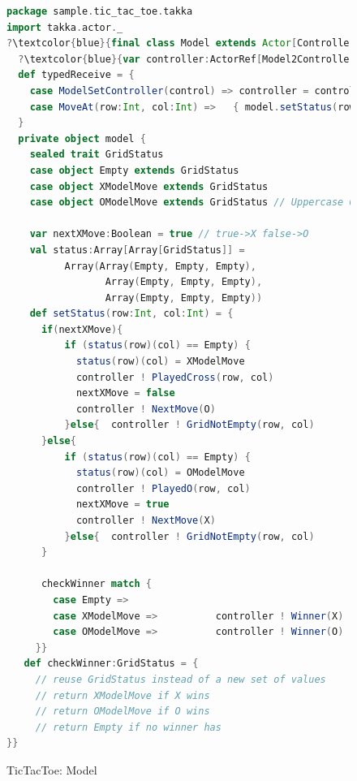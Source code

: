 \begin{figure}[p]

\begin{lstlisting}[language=scala, escapechar=?]
package sample.tic_tac_toe.takka
import takka.actor._
?\textcolor{blue}{final class Model extends Actor[Controller2ModelMessage]}? {
  ?\textcolor{blue}{var controller:ActorRef[Model2ControllerMessage]}? = _  
  def typedReceive = {
    case ModelSetController(control) => controller = control
    case MoveAt(row:Int, col:Int) =>   { model.setStatus(row, col)  }
  }  
  private object model {
    sealed trait GridStatus
    case object Empty extends GridStatus
    case object XModelMove extends GridStatus
    case object OModelMove extends GridStatus // Uppercase O
    
    var nextXMove:Boolean = true // true->X false->O    
    val status:Array[Array[GridStatus]] = 
          Array(Array(Empty, Empty, Empty),
                 Array(Empty, Empty, Empty),
                 Array(Empty, Empty, Empty))
    def setStatus(row:Int, col:Int) = {   
      if(nextXMove){
          if (status(row)(col) == Empty) {
            status(row)(col) = XModelMove
            controller ! PlayedCross(row, col)
            nextXMove = false
            controller ! NextMove(O)
          }else{  controller ! GridNotEmpty(row, col)          }
      }else{
          if (status(row)(col) == Empty) {
            status(row)(col) = OModelMove
            controller ! PlayedO(row, col)
            nextXMove = true
            controller ! NextMove(X)
          }else{  controller ! GridNotEmpty(row, col)          }     
      }

      checkWinner match {
        case Empty =>
        case XModelMove =>          controller ! Winner(X)
        case OModelMove =>          controller ! Winner(O)          
     }}
   def checkWinner:GridStatus = {
     // reuse GridStatus instead of a new set of values
     // return XModelMove if X wins
     // return OModelMove if O wins
     // return Empty if no winner has 
}}
\end{lstlisting}
\caption{TicTacToe: Model}
\label{TTT_model}
\end{figure}

